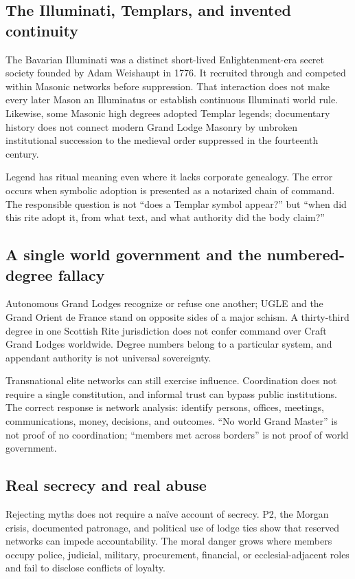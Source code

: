 \subsection{The Illuminati, Templars, and invented continuity}

The Bavarian Illuminati was a distinct short-lived Enlightenment-era secret society founded by Adam Weishaupt in 1776. It recruited through and competed within Masonic networks before suppression. That interaction does not make every later Mason an Illuminatus or establish continuous Illuminati world rule. Likewise, some Masonic high degrees adopted Templar legends; documentary history does not connect modern Grand Lodge Masonry by unbroken institutional succession to the medieval order suppressed in the fourteenth century.

Legend has ritual meaning even where it lacks corporate genealogy. The error occurs when symbolic adoption is presented as a notarized chain of command. The responsible question is not “does a Templar symbol appear?” but “when did this rite adopt it, from what text, and what authority did the body claim?”

\subsection{A single world government and the numbered-degree fallacy}

Autonomous Grand Lodges recognize or refuse one another; UGLE and the Grand Orient de France stand on opposite sides of a major schism. A thirty-third degree in one Scottish Rite jurisdiction does not confer command over Craft Grand Lodges worldwide. Degree numbers belong to a particular system, and appendant authority is not universal sovereignty.

Transnational elite networks can still exercise influence. Coordination does not require a single constitution, and informal trust can bypass public institutions. The correct response is network analysis: identify persons, offices, meetings, communications, money, decisions, and outcomes. “No world Grand Master” is not proof of no coordination; “members met across borders” is not proof of world government.

\subsection{Real secrecy and real abuse}

Rejecting myths does not require a naïve account of secrecy. P2, the Morgan crisis, documented patronage, and political use of lodge ties show that reserved networks can impede accountability. The moral danger grows where members occupy police, judicial, military, procurement, financial, or ecclesial-adjacent roles and fail to disclose conflicts of loyalty.

